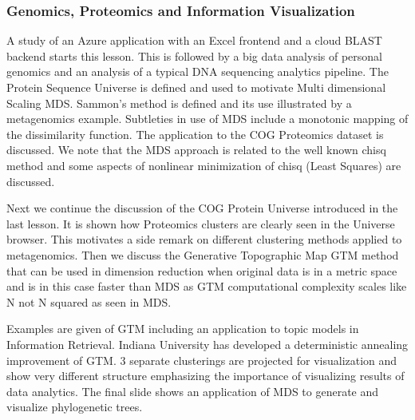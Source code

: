 \subsubsection{Genomics, Proteomics and Information
Visualization}\label{genomics-proteomics-and-information-visualization}

A study of an Azure application with an Excel frontend and a cloud BLAST
backend starts this lesson. This is followed by a big data analysis of
personal genomics and an analysis of a typical DNA sequencing analytics
pipeline. The Protein Sequence Universe is defined and used to motivate
Multi dimensional Scaling MDS. Sammon's method is defined and its use
illustrated by a metagenomics example. Subtleties in use of MDS include
a monotonic mapping of the dissimilarity function. The application to
the COG Proteomics dataset is discussed. We note that the MDS approach
is related to the well known chisq method and some aspects of nonlinear
minimization of chisq (Least Squares) are discussed.


\begin{comment}
\video{Health}{6:56}{ CC) Genomics, Proteomics and  Information Visualization}{https://drive.google.com/file/d/0B5plU-u0wqMoVzduODM0Z2dFYWM/view?usp=sharing}
\end{comment}

Next we continue the discussion of the COG Protein Universe introduced
in the last lesson. It is shown how Proteomics clusters are clearly seen
in the Universe browser. This motivates a side remark on different
clustering methods applied to metagenomics. Then we discuss the
Generative Topographic Map GTM method that can be used in dimension
reduction when original data is in a metric space and is in this case
faster than MDS as GTM computational complexity scales like N not N
squared as seen in MDS.

Examples are given of GTM including an application to topic models in
Information Retrieval. Indiana University has developed a deterministic
annealing improvement of GTM. 3 separate clusterings are projected for
visualization and show very different structure emphasizing the
importance of visualizing results of data analytics. The final slide
shows an application of MDS to generate and visualize phylogenetic
trees.


